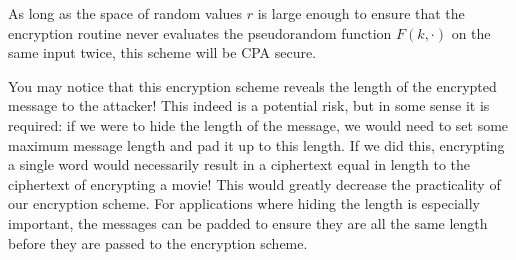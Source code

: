 As long as the space of random values $r$ is large enough to ensure that
the encryption routine never evaluates the pseudorandom function $F(k, \cdot)$
on the same input twice, this scheme will be CPA secure.

You may notice that this encryption scheme reveals
the length of the encrypted message to the attacker! This
indeed is a potential risk, but in some sense it
is required: if we were to hide the length of the
message, we would need to set some maximum message
length and pad it up to this length. If we did
this, encrypting a single word would necessarily
result in a ciphertext equal in length to the
ciphertext of encrypting a movie! This would
greatly decrease the practicality of our
encryption scheme. For applications where hiding
the length is especially important, the messages
can be padded to ensure they are all the same
length before they are passed to the encryption
scheme.

